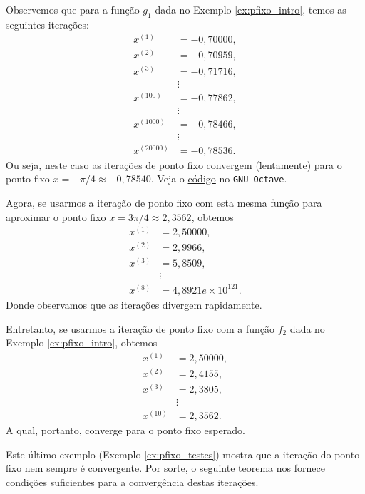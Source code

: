 \begin{ex}\label{ex:pfixo_testes}
  Observemos que para a função $g_1$ dada no Exemplo \ref{ex:pfixo_intro}, temos as seguintes iterações:
  \begin{align}
    x^{(1)} &= -0,70000,\\
    x^{(2)} &= -0,70959,\\
    x^{(3)} &= -0,71716,\\
    &\vdots \\
    x^{(100)} &= -0,77862,\\
    &\vdots \\
    x^{(1000)} &= -0,78466,\\    
    &\vdots \\
    x^{(20000)} &= -0,78536.
  \end{align}
Ou seja, neste caso as iterações de ponto fixo convergem (lentamente) para o ponto fixo $x=-\pi/4\approx -0,78540$.
\ifisoctave
Veja o \href{https://github.com/phkonzen/notas/blob/master/src/MatematicaNumerica/cap_eq1d/dados/ex_pfixo_testes/ex_g1_t1.m}{código} no \verb+GNU Octave+.
\fi

Agora, se usarmos a iteração de ponto fixo com esta mesma função para aproximar o ponto fixo $x=3\pi/4\approx 2,3562$, obtemos
  \begin{align}
    x^{(1)} &= 2,50000,\\
    x^{(2)} &= 2,9966,\\
    x^{(3)} &= 5,8509,\\
    &\vdots \\
    x^{(8)} &= 4,8921e\times 10^{121}.
  \end{align}
Donde observamos que as iterações divergem rapidamente.

Entretanto, se usarmos a iteração de ponto fixo com a função $f_2$ dada no Exemplo \ref{ex:pfixo_intro}, obtemos
  \begin{align}
    x^{(1)} &= 2,50000,\\
    x^{(2)} &= 2,4155,\\
    x^{(3)} &= 2,3805,\\
    &\vdots \\
    x^{(10)} &= 2,3562.
  \end{align}
A qual, portanto, converge para o ponto fixo esperado.
\end{ex}

Este último exemplo (Exemplo \ref{ex:pfixo_testes}) mostra que a iteração do ponto fixo nem sempre é convergente. Por sorte, o seguinte teorema nos fornece condições suficientes para a convergência destas iterações.

